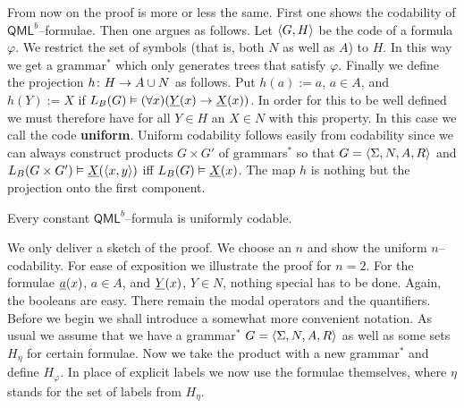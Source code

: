 From now on the proof is more or less the same. First one shows
the codability of $\mathsf{QML}^b$--formulae. Then one argues
as follows. Let $\langle G, H\rangle$ be the code of a formula $\varphi$.
We restrict the set of symbols (that is, both $N$ as well as $A$)
to $H$. In this way we get a grammar$^{\ast}$ which only generates
trees that satisfy $\varphi$. Finally we define the projection
$h \colon H \rightarrow A \cup N$ as follows. Put $h(a) := a$, $a \in A$,
and $h(Y) := X$ if $L_B(G) \vDash (\forall x)( \uli{Y}(x) \pf %
\uli{X}(x))$. In order for this to be well defined we must 
therefore have for all $Y \in H$ an $X \in N$ with this property. 
In this
case we call the code \textbf{uniform}. Uniform codability follows
easily from codability since we can always construct products
$G \times G'$ of grammars$^{\ast}$ so that
$G = \langle \Sigma, N, A, R\rangle$ and $L_B(G \times G') \vDash
\underline{X}(\langle x,y\rangle)$ iff $L_B(G) \vDash
\underline{X}(x)$. The map $h$ is nothing but the projection onto
the first component.
\begin{thm}
\label{thm:codeb}
Every constant $\mathsf{QML}^b$--formula is uniformly codable.
\end{thm}
\proofbeg We only deliver a sketch of the proof. We choose an $n$
and show the uniform $n$--codability. For ease of exposition we
illustrate the proof for $n = 2$. For the formulae $\underline{a}(x)$, $a
\in A$, and $\underline{Y}(x)$, $Y \in N$, nothing special has to be
done. Again, the booleans are easy. There remain the modal
operators and the quantifiers. Before we begin we shall introduce
a somewhat more convenient notation. As usual we assume that we
have a grammar$^{\ast}$ $G = \langle \Sigma, N, A, R\rangle$ as well as
some sets $H_{\eta}$ for certain formulae. Now we take the product
with a new grammar$^{\ast}$ and define $H_{\varphi}$. In place of
explicit labels we now use the formulae themselves, where $\eta$
stands for the set of labels from $H_{\eta}$.

